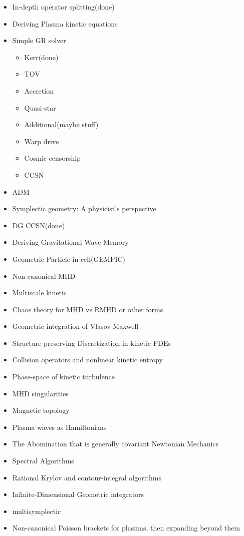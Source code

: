 \begin{itemize}
\begin{itemize}
	      \end{itemize}
	\item In-depth operator splitting(done)
	\item Deriving Plasma kinetic equations
	\item Simple GR solver
	      \begin{itemize}
		      \item Kerr(done)
		      \item TOV
		      \item Accretion
		      \item Quasi-star
		      \item Additional(maybe stuff)
		      \item Warp drive
		      \item Cosmic censorship
		      \item CCSN
	      \end{itemize}
	\item ADM
	\item Symplectic geometry: A physicist's perspective
	\item DG CCSN(done)
	\item Deriving Gravitational Wave Memory
	\item Geometric Particle in cell(GEMPIC)
	\item Non-canonical MHD
	\item Multiscale kinetic
	\item Chaos theory for MHD vs RMHD or other forms
	\item Geometric integration of Vlasov-Maxwell
	\item Structure preserving Discretization in kinetic PDEs
	\item Collision operators and nonlinear kinetic entropy
	\item Phase-space of kinetic turbulence
	\item MHD singularities
	\item Magnetic topology
	\item Plasma waves as Hamiltonians
	\item The Abomination that is generally covariant Newtonian Mechanics
	\item Spectral Algorithms
	\item Rational Krylov and contour-integral algorithms
	\item Infinite-Dimensional Geometric integrators
	\item multisymplectic
	\item Non-canonical Poisson brackets for plasmas, then expanding beyond them

\end{itemize}
